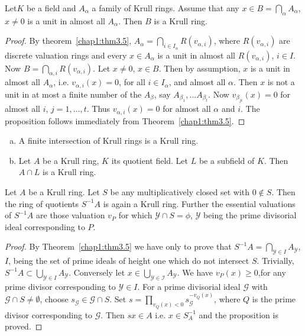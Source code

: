 \begin{prop}\label{chap1:prop4.1} %
Let\pageoriginale $K$ be a field and $A_\alpha$ a family of Krull
rings. Assume 
  that any $x \in B = \bigcap\limits_{\alpha} A_\alpha$, $x \neq 0$ is
  a unit in almost all $A_\alpha$. Then $B$ is a Krull ring.   
\end{prop}  

\begin{proof}
By theorem~\ref{chap1:thm3.5}, $A_{\alpha}= \bigcap\limits_{i \in
  I_\alpha} R (v_{\alpha, 
  i})$, where $R(v_{\alpha , i})$ are discrete valuation rings and
every $x \in A_\alpha$ is a unit in almost all $R(v_{\alpha , i})$, $i
  \in I$. Now $B = \bigcap\limits_{\alpha , i} R (v_{\alpha ,
  i})$. Let $x \neq 0$, $x \in B$. Then by assumption, $x$ is a unit in
almost all $A_{\alpha}$, i.e. $v_{\alpha, i} (x) = 0$, for all $i \in
I_\alpha$, and almost all $\alpha$. Then $x$ is not a unit in at most a
finite number of the $A_\beta$, say $A_{\beta_1} , \ldots
A_{\beta_t}$. Now $v_{\beta_{ji}} (x) = 0$ for almost all $i$, $j = 1,
\ldots , t$. Thus $v_{\alpha, i}(x) = 0$ for almost all $\alpha$ and
$i$. The proposition follows immediately from Theorem~\ref{chap1:thm3.5}. 
\end{proof}  
  
\begin{coro*} %
\begin{enumerate}[(a)]
\item A finite intersection of Krull rings is a Krull ring.

\item Let $A$ be a Krull ring, $K$ its quotient field. Let
$L$ be a subfield of $K$. Then $A \cap L$ is a Krull ring.
\end{enumerate}
  \end{coro*} 
   
  \begin{prop} %
Let $A$ be a Krull ring. Let $S$ be any multiplicatively closed
  set with $0 \notin S$. Then the ring of quotients $S^{-1} A$ is
  again a Krull ring. Further the essential valuations of $S^{-1} A$
  are those valuation $v_P$ for which $\mathscr{Y} \cap S = \phi$,
  $\mathscr{Y}$ being the prime divisorial ideal corresponding to $P$. 
  \end{prop} 
   
\begin{proof}
By Theorem~\ref{chap1:thm3.5} we have only to prove that $S^{-1} A =
\bigcap\limits_{\mathscr{Y} \in I} A_\mathscr{Y}$, $I$, being the set of
prime ideals of height one which do not intersect $S$. Trivially,
$S^{-1} A \subset \bigcup\limits_{\mathscr{Y} \in I}
A_\mathscr{Y}$. Conversely let $x \in \bigcup\limits_{\mathscr{Y \in
    I}} A_\mathscr{Y}$. We have $v_P (x) \ge 0$,\pageoriginale for any
prime divisor 
corresponding to $\mathscr{Y} \in I$. For a prime divisorial ideal
$\mathscr{G}$ with $\mathscr{G} \cap S \neq\emptyset$, choose
$s_\mathscr{G} \in \mathscr{G} \cap S$. Set $s =
\prod\limits_{v_{Q}(x) < 0} s^{- v_Q (x)}_{\mathscr{G}}$, where
$Q$ is the prime divisor corresponding to $\mathscr{G}$. Then $sx \in
A $ i.e. $x \in S^{-1}_A$ and the proposition is proved. 
\end{proof}  
  
